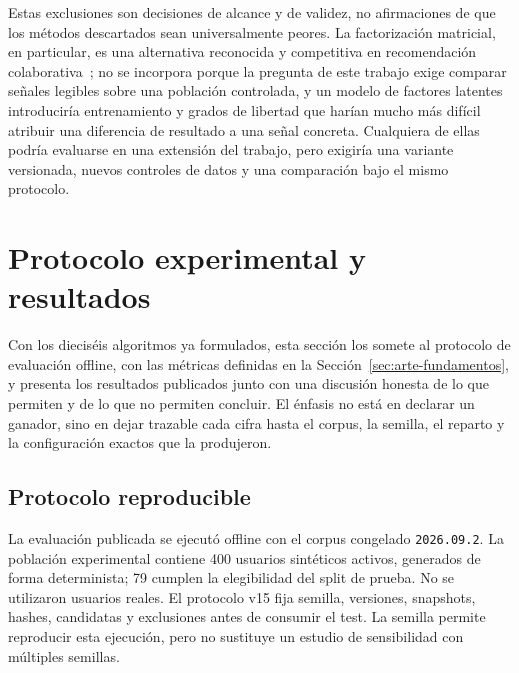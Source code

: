 Estas exclusiones son decisiones de alcance y de validez, no afirmaciones de que los métodos
descartados sean universalmente peores. La factorización matricial, en particular, es una
alternativa reconocida y competitiva en recomendación colaborativa~\cite{koren2009matrix}; no
se incorpora porque la pregunta de este trabajo exige comparar señales legibles sobre una
población controlada, y un modelo de factores latentes introduciría entrenamiento y grados de
libertad que harían mucho más difícil atribuir una diferencia de resultado a una señal
concreta. Cualquiera de ellas podría evaluarse en una extensión del trabajo, pero exigiría una
variante versionada, nuevos controles de datos y una comparación bajo el mismo protocolo.

\section{Protocolo experimental y resultados}\label{cap:experimentos}

Con los dieciséis algoritmos ya formulados, esta sección los somete al protocolo de evaluación
offline, con las métricas definidas en la Sección~\ref{sec:arte-fundamentos}, y presenta los
resultados publicados junto con una discusión honesta de lo que permiten y de lo que no
permiten concluir. El énfasis no está en declarar un ganador, sino en dejar trazable cada cifra
hasta el corpus, la semilla, el reparto y la configuración exactos que la produjeron.

\subsection{Protocolo reproducible}

La evaluación publicada se ejecutó offline con el corpus congelado \texttt{2026.09.2}. La población experimental contiene 400 usuarios sintéticos activos, generados de forma determinista; 79 cumplen la elegibilidad del split de prueba. No se utilizaron usuarios reales. El protocolo v15 fija semilla, versiones, snapshots, hashes, candidatas y exclusiones antes de consumir el test. La semilla permite reproducir esta ejecución, pero no sustituye un estudio de sensibilidad con múltiples semillas.

